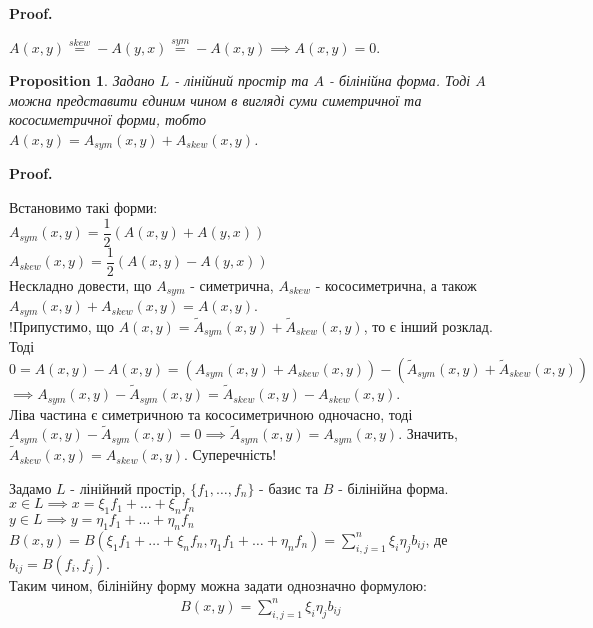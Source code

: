 \documentclass[a4paper, 10pt]{article}
\makeatletter
\theoremstyle{theoremdd}
\newtheorem{proposition}[theorem]{Proposition}
\renewenvironment{proof}[1][Proof.\\]{\par
\pushQED{\hfill \qed}%
\normalfont \topsep6\p@\@plus6\p@\relax
\trivlist
\item\relax
{\bfseries
#1\@addpunct{.}}\hspace\labelsep\ignorespaces
}{%
\popQED\endtrivlist\@endpefalse
}
\makeatother
\begin{document}
\begin{proof}
$A(x,y) \overset{skew}{=} -A(y,x) \overset{sym}{=} -A(x,y) \implies A(x,y) = 0$.
\end{proof}

\begin{proposition}
Задано $L$ - лінійний простір та $A$ - білінійна форма. Тоді $A$ можна представити єдиним чином в вигляді суми симетричної та кососиметричної форми, тобто\\
$A(x,y) = A_{sym}(x,y) + A_{skew}(x,y)$.
\end{proposition}

\begin{proof}
Встановимо такі форми: \\
$A_{sym}(x,y) = \dfrac{1}{2} \left( A(x,y) + A(y,x) \right)$ \\
$A_{skew}(x,y) = \dfrac{1}{2} \left( A(x,y) - A(y,x) \right)$ \\
Нескладно довести, що $A_{sym}$ - симетрична, $A_{skew}$ - кососиметрична, а також \\ $A_{sym}(x,y) + A_{skew}(x,y) = A(x,y)$.
\bigskip \\
!Припустимо, що $A(x,y) = \tilde{A}_{sym}(x,y) + \tilde{A}_{skew}(x,y)$, то є інший розклад. Тоді\\
$0 = A(x,y) - A(x,y) = (A_{sym}(x,y) + A_{skew}(x,y)) - (\tilde{A}_{sym}(x,y) + \tilde{A}_{skew}(x,y))$\\
$\implies A_{sym}(x,y) - \tilde{A}_{sym}(x,y) = \tilde{A}_{skew}(x,y) - A_{skew}(x,y)$.\\
Ліва частина є симетричною та кососиметричною одночасно, тоді $A_{sym}(x,y) - \tilde{A}_{sym}(x,y) = 0 \implies \tilde{A}_{sym}(x,y) = A_{sym}(x,y)$. Значить, $\tilde{A}_{skew}(x,y) = A_{skew}(x,y)$. Суперечність!
\end{proof}

Задамо $L$ - лінійний простір, $\{f_1,\dots,f_n\}$ - базис та $B$ - білінійна форма.\\
$x \in L \implies x = \xi_1 f_1 + \dots + \xi_n f_n$\\
$y \in L \implies y = \eta_1 f_1 + \dots + \eta_n f_n$\\
$B(x,y) = B(\xi_1 f_1 + \dots + \xi_n f_n, \eta_1 f_1 + \dots + \eta_n f_n) = \displaystyle\sum_{i,j=1}^n \xi_i \eta_j b_{ij}$, де $b_{ij} = B(f_i,f_j)$.\\
Таким чином, білінійну форму можна задати однозначно формулою:
\begin{align*}
B(x,y) = \sum_{i,j=1}^n \xi_i \eta_j b_{ij}
\end{align*}
\end{document}
